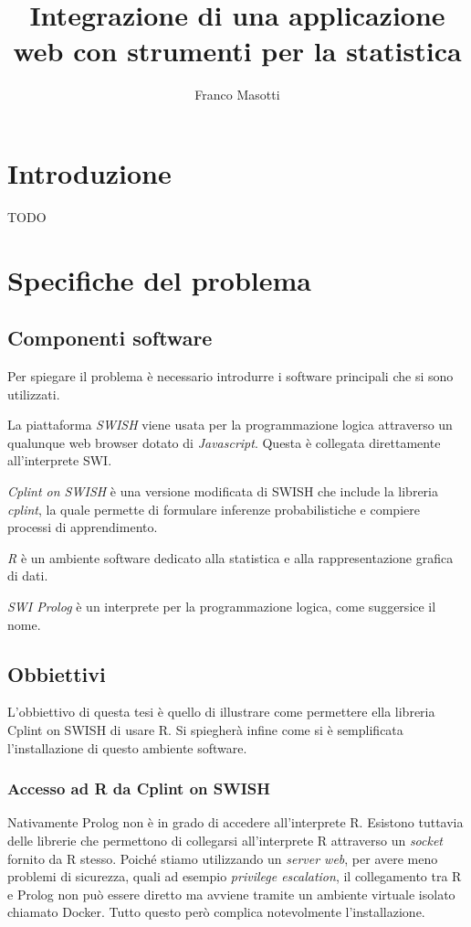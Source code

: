 \documentclass[10pt,titlepage,twoside,a4paper]{report}
\title{Integrazione di una applicazione web con strumenti per la statistica}
\author{Franco Masotti}
\begin{document}

\maketitle
\newpage
\tableofcontents
\newpage
\listoffigures
\newpage
\listoflistings
\cleardoublepage





\chapter{Introduzione} \label{introduzione}

TODO

\chapter{Specifiche del problema} \label{ch:specifiche-del-problema}
    \section{Componenti software}
Per spiegare il problema è necessario introdurre i software principali che si 
sono utilizzati.

La piattaforma \emph{SWISH}\cite{SWISH} viene usata per la programmazione 
logica attraverso un qualunque web browser dotato di \emph{Javascript}. Questa 
è collegata direttamente all'interprete SWI.

\emph{Cplint on SWISH} è una versione modificata di SWISH che include la 
libreria \emph{cplint}, la quale permette di formulare inferenze 
probabilistiche e compiere processi di apprendimento\cite{cplint}.

\emph{R} è un ambiente software dedicato alla statistica e 
alla rappresentazione grafica di dati\cite{r}.

\emph{SWI Prolog} è un interprete per la programmazione 
logica\cite{swiprolog}, come suggersice il nome\cite{prolog}.

    \section{Obbiettivi}
L'obbiettivo di questa tesi è quello di illustrare come 
permettere ella libreria Cplint on SWISH di usare R.
Si spiegherà infine come si è semplificata l'installazione di questo ambiente 
software.

        \subsection{Accesso ad R da Cplint on SWISH}
Nativamente Prolog non è in grado di accedere all'interprete R. Esistono 
tuttavia delle librerie che permettono di collegarsi all'interprete R
attraverso un \emph{socket} fornito da R stesso. Poiché stiamo utilizzando  
un \emph{server web}, per avere meno problemi di sicurezza, quali ad esempio 
\emph{privilege escalation}, il collegamento tra R e Prolog non può essere 
diretto ma avviene tramite un ambiente virtuale isolato chiamato Docker. 
Tutto questo però complica notevolmente l'installazione.
\end{document}
